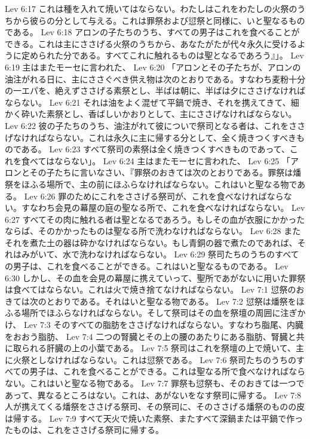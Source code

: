 Lev 6:17  これは種を入れて焼いてはならない。わたしはこれをわたしの火祭のうちから彼らの分として与える。これは罪祭および愆祭と同様に、いと聖なるものである。
Lev 6:18  アロンの子たちのうち、すべての男子はこれを食べることができる。これは主にささげる火祭のうちから、あなたがたが代々永久に受けるように定められた分である。すべてこれに触れるものは聖となるであろう』」。
Lev 6:19  主はまたモーセに言われた、
Lev 6:20  「アロンとその子たちが、アロンの油注がれる日に、主にささぐべき供え物は次のとおりである。すなわち麦粉十分の一エパを、絶えずささげる素祭とし、半ばは朝に、半ばは夕にささげなければならない。
Lev 6:21  それは油をよく混ぜて平鍋で焼き、それを携えてきて、細かく砕いた素祭とし、香ばしいかおりとして、主にささげなければならない。
Lev 6:22  彼の子たちのうち、油注がれて彼についで祭司となる者は、これをささげなければならない。これは永久に主に帰する分として、全く焼きつくすべきものである。
Lev 6:23  すべて祭司の素祭は全く焼きつくすべきものであって、これを食べてはならない」。
Lev 6:24  主はまたモーセに言われた、
Lev 6:25  「アロンとその子たちに言いなさい、『罪祭のおきては次のとおりである。罪祭は燔祭をほふる場所で、主の前にほふらなければならない。これはいと聖なる物である。
Lev 6:26  罪のためにこれをささげる祭司が、これを食べなければならない。すなわち会見の幕屋の庭の聖なる所で、これを食べなければならない。
Lev 6:27  すべてその肉に触れる者は聖となるであろう。もしその血が衣服にかかったならば、そのかかったものは聖なる所で洗わなければならない。
Lev 6:28  またそれを煮た土の器は砕かなければならない。もし青銅の器で煮たのであれば、それはみがいて、水で洗わなければならない。
Lev 6:29  祭司たちのうちのすべての男子は、これを食べることができる。これはいと聖なるものである。
Lev 6:30  しかし、その血を会見の幕屋に携えていって、聖所であがないに用いた罪祭は食べてはならない。これは火で焼き捨てなければならない。
Lev 7:1  愆祭のおきては次のとおりである。それはいと聖なる物である。
Lev 7:2  愆祭は燔祭をほふる場所でほふらなければならない。そして祭司はその血を祭壇の周囲に注ぎかけ、
Lev 7:3  そのすべての脂肪をささげなければならない。すなわち脂尾、内臓をおおう脂肪、
Lev 7:4  二つの腎臓とその上の腰のあたりにある脂肪、腎臓と共に取られる肝臓の上の小葉である。
Lev 7:5  祭司はこれを祭壇の上で焼いて、主に火祭としなければならない。これは愆祭である。
Lev 7:6  祭司たちのうちのすべての男子は、これを食べることができる。これは聖なる所で食べなければならない。これはいと聖なる物である。
Lev 7:7  罪祭も愆祭も、そのおきては一つであって、異なるところはない。これは、あがないをなす祭司に帰する。
Lev 7:8  人が携えてくる燔祭をささげる祭司、その祭司に、そのささげる燔祭のものの皮は帰する。
Lev 7:9  すべて天火で焼いた素祭、またすべて深鍋または平鍋で作ったものは、これをささげる祭司に帰する。
